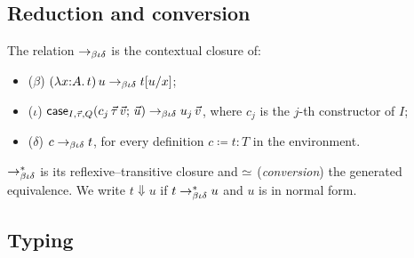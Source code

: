 \subsection{Reduction and conversion}

\begin{definition}[Reduction]
\label{def:reduction}
The relation $\rightarrow_{\beta\iota\delta}$ is the contextual closure of:
\begin{itemize}
\item ($\beta$)\; $(\lambda x{:}A.\,t)\,u \rightarrow_{\beta\iota\delta} t[u/x]$;
\item ($\iota$)\; $\mathsf{case}_{I,\vec{\tau},Q}(c_j\,\vec{\tau}\,\vec{v};\,\vec{u})
      \rightarrow_{\beta\iota\delta} u_j\,\vec{v}$, where $c_j$ is the $j$-th constructor of $I$;
\item ($\delta$)\; $c \rightarrow_{\beta\iota\delta} t$, for every definition
      $c \coloneqq t : T$ in the environment.
\end{itemize}
$\rightarrow_{\beta\iota\delta}^{*}$ is its reflexive--transitive closure and $\simeq$
(\emph{conversion}) the generated equivalence.  We write $t \Downarrow
u$ if $t \rightarrow_{\beta\iota\delta}^{*} u$ and $u$ is in normal form.
\end{definition}

\subsection{Typing}

